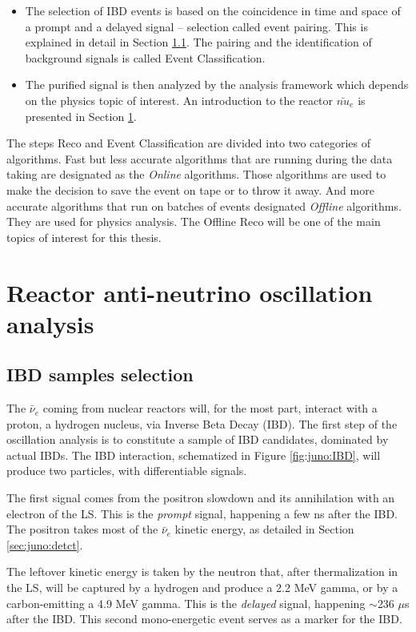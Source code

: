 \documentclass[../main.tex]{subfiles}
\begin{document}
\begin{itemize}
  \item The selection of IBD events is based on the coincidence in time and space of a prompt and a delayed signal -- selection called event pairing. This is explained in detail in Section \ref{sec:juno:Fit:selection}. The pairing and the identification of background signals is called Event Classification.
  \item The purified signal is then analyzed by the analysis framework which depends on the physics topic of interest. An introduction to the reactor $\bar{nu}_e$ is presented in Section \ref{sec:juno:Fit}.
\end{itemize}

The steps Reco and Event Classification are divided into two categories of algorithms. Fast but less accurate algorithms that are running during the data taking are designated as the \textit{Online} algorithms. Those algorithms are used to make the decision to save the event on tape or to throw it away. And more accurate algorithms that run on batches of events designated \textit{Offline} algorithms. They are used for physics analysis. The Offline Reco will be one of the main topics of interest for this thesis.


\section{Reactor anti-neutrino oscillation analysis}
\label{sec:juno:Fit}


\subsection{IBD samples selection}
\label{sec:juno:Fit:selection}

The $\bar{\nu}_e$ coming from nuclear reactors will, for the most part, interact with a proton, a hydrogen nucleus, via Inverse Beta Decay (IBD).
The first step of the oscillation analysis is to constitute a sample of IBD candidates, dominated by actual IBDs. The IBD interaction, schematized in Figure \ref{fig:juno:IBD}, will produce two particles, with differentiable signals.

The first signal comes from the positron slowdown and its annihilation with an electron of the LS. This is the \textit{prompt} signal, happening a few ns after the IBD. The positron takes most of the $\bar{\nu}_e$ kinetic energy, as detailed in Section \ref{sec:juno:detct}.

The leftover kinetic energy is taken by the neutron that, after thermalization in the LS, will be captured by a hydrogen and produce a 2.2 MeV gamma, or by a carbon-emitting a 4.9 MeV gamma. This is the \textit{delayed} signal, happening $\sim$236 $\mu$s after the IBD. This second mono-energetic event serves as a marker for the IBD.
\end{document}
